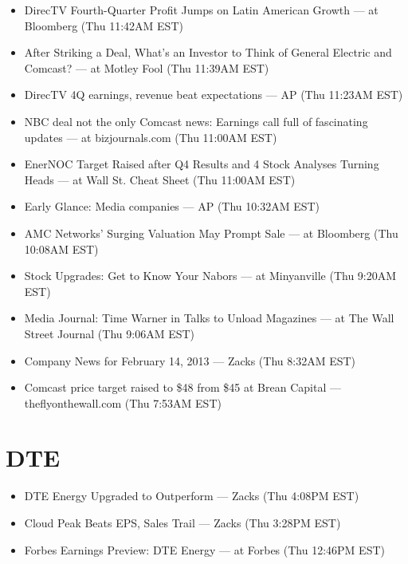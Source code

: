 \documentclass[11pt,asymmetric]{article}
\begin{document}
\begin{itemize}
\item DirecTV Fourth-Quarter Profit Jumps on Latin American Growth --- at Bloomberg (Thu 11:42AM EST)
\item After Striking a Deal, What's an Investor to Think of General Electric and Comcast? --- at Motley Fool (Thu 11:39AM EST)
\item DirecTV 4Q earnings, revenue beat expectations --- AP (Thu 11:23AM EST)
\item NBC deal not the only Comcast news: Earnings call full of fascinating updates --- at bizjournals.com (Thu 11:00AM EST)
\item EnerNOC Target Raised after Q4 Results and 4 Stock Analyses Turning Heads --- at Wall St. Cheat Sheet (Thu 11:00AM EST)
\item Early Glance: Media companies --- AP (Thu 10:32AM EST)
\item AMC Networks’ Surging Valuation May Prompt Sale --- at Bloomberg (Thu 10:08AM EST)
\item Stock Upgrades: Get to Know Your Nabors --- at Minyanville (Thu 9:20AM EST)
\item Media Journal: Time Warner in Talks to Unload Magazines --- at The Wall Street Journal (Thu 9:06AM EST)
\item Company News for February 14, 2013 --- Zacks (Thu 8:32AM EST)
\item Comcast price target raised to \$48 from \$45 at Brean Capital --- theflyonthewall.com (Thu 7:53AM EST)
\end{itemize}

\section*{DTE}
\begin{itemize}
\item DTE Energy Upgraded to Outperform --- Zacks (Thu 4:08PM EST)
\item Cloud Peak Beats EPS, Sales Trail --- Zacks (Thu 3:28PM EST)
\item Forbes Earnings Preview: DTE Energy --- at Forbes (Thu 12:46PM EST)
\end{itemize}
\end{document}
